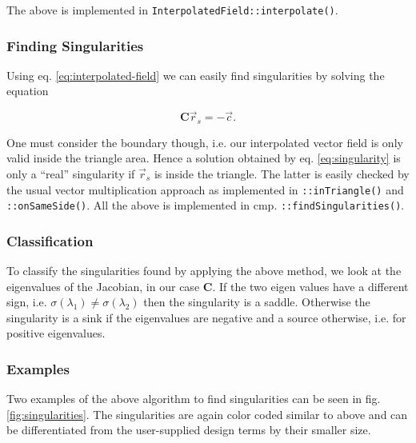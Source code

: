 \documentclass[a4paper,10pt,notitlepage]{scrartcl}
\newcommand{\mat}[1]{\mathbf{#1}}
\begin{document}
The above is implemented in \texttt{InterpolatedField::interpolate()}.

\subsubsection{Finding Singularities}

Using eq. \ref{eq:interpolated-field} we can easily find singularities by
solving the equation

\begin{equation}
 \mat{C} \vec{r}_s = - \vec{c}.
 \label{eq:singularity}
\end{equation}

One must consider the boundary though, i.e. our interpolated vector field is
only valid inside the triangle area. Hence a solution obtained by
eq. \ref{eq:singularity} is only a ``real'' singularity if $\vec{r}_s$ is
inside the triangle. The latter is easily checked by the usual vector
multiplication approach as implemented in \texttt{::inTriangle()} and
\texttt{::onSameSide()}. All the above is implemented in cmp.
\texttt{::findSingularities()}.

\subsubsection{Classification}

To classify the singularities found by applying the above method, we look at
the eigenvalues of the Jacobian, in our case $\mat{C}$. If the two eigen values
have a different sign, i.e. $\sigma(\lambda_1) \neq \sigma(\lambda_2)$ then the
singularity is a saddle. Otherwise the singularity is a sink if the eigenvalues
are negative and a source otherwise, i.e. for positive eigenvalues.

\subsubsection{Examples}

Two examples of the above algorithm to find singularities can be seen in fig.
\ref{fig:singularities}. The singularities are again color coded similar to
above and can be differentiated from the user-supplied design terms by their
smaller size.
\end{document}
